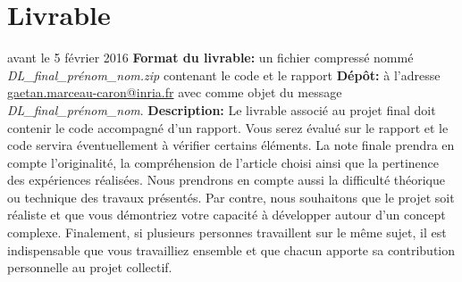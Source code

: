 \documentclass{article}
\begin{document}
\newpage

\section{Livrable}
 avant le 5 février 2016 \newline
{\bf Format du livrable:} un fichier compressé nommé {\it DL\_final\_prénom\_nom.zip} contenant le code et le rapport \newline
{\bf Dépôt:} à l'adresse \url{gaetan.marceau-caron@inria.fr} avec comme objet du message {\it DL\_final\_prénom\_nom}.\newline
{\bf Description:}\newline
Le livrable associé au projet final doit contenir le code accompagné d'un rapport.
Vous serez évalué sur le rapport et le code servira éventuellement à vérifier certains éléments.
La note finale prendra en compte l'originalité, la compréhension de l'article choisi ainsi que la pertinence des expériences réalisées.
Nous prendrons en compte aussi la difficulté théorique ou technique des travaux présentés. 
Par contre, nous souhaitons que le projet soit réaliste et que vous démontriez votre capacité à développer autour d'un concept complexe.
Finalement, si plusieurs personnes travaillent sur le même sujet, il est indispensable que vous travailliez ensemble et que chacun apporte sa contribution personnelle au projet collectif.
\end{document}
